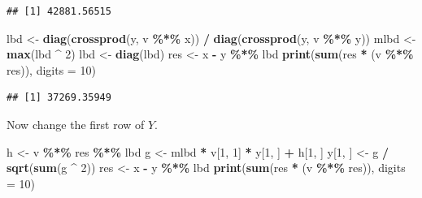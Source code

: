 \documentclass[
  12pt,
]{article}
\newenvironment{Shaded}{\begin{snugshade}}{\end{snugshade}}
\newcommand{\AttributeTok}[1]{\textcolor[rgb]{0.13,0.29,0.53}{#1}}
\newcommand{\DecValTok}[1]{\textcolor[rgb]{0.00,0.00,0.81}{#1}}
\newcommand{\FunctionTok}[1]{\textcolor[rgb]{0.13,0.29,0.53}{\textbf{#1}}}
\newcommand{\NormalTok}[1]{#1}
\newcommand{\OtherTok}[1]{\textcolor[rgb]{0.56,0.35,0.01}{#1}}
\newcommand{\SpecialCharTok}[1]{\textcolor[rgb]{0.81,0.36,0.00}{\textbf{#1}}}
\begin{document}
\begin{verbatim}
## [1] 42881.56515
\end{verbatim}

\begin{Shaded}
\begin{Highlighting}[]
\NormalTok{lbd }\OtherTok{\textless{}{-}} \FunctionTok{diag}\NormalTok{(}\FunctionTok{crossprod}\NormalTok{(y, v }\SpecialCharTok{\%*\%}\NormalTok{ x)) }\SpecialCharTok{/} \FunctionTok{diag}\NormalTok{(}\FunctionTok{crossprod}\NormalTok{(y, v }\SpecialCharTok{\%*\%}\NormalTok{ y))}
\NormalTok{mlbd }\OtherTok{\textless{}{-}} \FunctionTok{max}\NormalTok{(lbd }\SpecialCharTok{\^{}} \DecValTok{2}\NormalTok{)}
\NormalTok{lbd }\OtherTok{\textless{}{-}} \FunctionTok{diag}\NormalTok{(lbd)}
\NormalTok{res }\OtherTok{\textless{}{-}}\NormalTok{ x }\SpecialCharTok{{-}}\NormalTok{ y }\SpecialCharTok{\%*\%}\NormalTok{ lbd}
\FunctionTok{print}\NormalTok{(}\FunctionTok{sum}\NormalTok{(res }\SpecialCharTok{*}\NormalTok{ (v }\SpecialCharTok{\%*\%}\NormalTok{ res)), }\AttributeTok{digits =} \DecValTok{10}\NormalTok{)}
\end{Highlighting}
\end{Shaded}

\begin{verbatim}
## [1] 37269.35949
\end{verbatim}

Now change the first row of \(Y\).

\begin{Shaded}
\begin{Highlighting}[]
\NormalTok{h }\OtherTok{\textless{}{-}}\NormalTok{ v }\SpecialCharTok{\%*\%}\NormalTok{ res }\SpecialCharTok{\%*\%}\NormalTok{ lbd}
\NormalTok{g }\OtherTok{\textless{}{-}}\NormalTok{ mlbd }\SpecialCharTok{*}\NormalTok{ v[}\DecValTok{1}\NormalTok{, }\DecValTok{1}\NormalTok{] }\SpecialCharTok{*}\NormalTok{ y[}\DecValTok{1}\NormalTok{, ] }\SpecialCharTok{+}\NormalTok{ h[}\DecValTok{1}\NormalTok{, ]}
\NormalTok{y[}\DecValTok{1}\NormalTok{, ] }\OtherTok{\textless{}{-}}\NormalTok{ g }\SpecialCharTok{/} \FunctionTok{sqrt}\NormalTok{(}\FunctionTok{sum}\NormalTok{(g }\SpecialCharTok{\^{}} \DecValTok{2}\NormalTok{))}
\NormalTok{res }\OtherTok{\textless{}{-}}\NormalTok{ x }\SpecialCharTok{{-}}\NormalTok{ y }\SpecialCharTok{\%*\%}\NormalTok{ lbd}
\FunctionTok{print}\NormalTok{(}\FunctionTok{sum}\NormalTok{(res }\SpecialCharTok{*}\NormalTok{ (v }\SpecialCharTok{\%*\%}\NormalTok{ res)), }\AttributeTok{digits =} \DecValTok{10}\NormalTok{)}
\end{Highlighting}
\end{Shaded}
\end{document}

